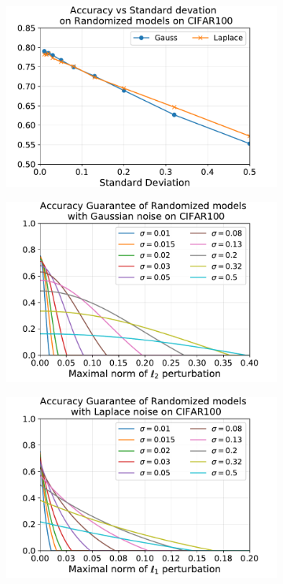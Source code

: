 \begin{figure}[htb]
  \centering
  \begin{subfigure}[t]{0.31\textwidth}
    \centering
    \includegraphics[scale=0.32]{figures/appendix2/acc_sd_CIFAR100.pdf}
    \caption{}
    \label{figure:ap2-acc_sd_CIFAR100-appendix}
  \end{subfigure}
  \begin{subfigure}[t]{0.31\textwidth}
    \centering
    \includegraphics[scale=0.32]{figures/appendix2/gauss_certif_CIFAR100.pdf}
    \caption{}
    \label{figure:ap2-gauss_certif_CIFAR100-appendix}
  \end{subfigure}
  \begin{subfigure}[t]{0.31\textwidth}
    \centering
    \includegraphics[scale=0.32]{figures/appendix2/laplace_certif_CIFAR100.pdf}

\end{subfigure}
\end{figure}
